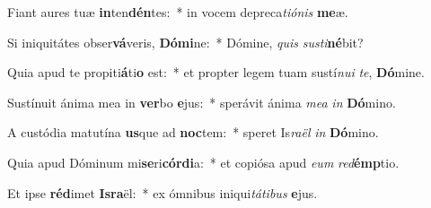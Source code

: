 \item Fiant aures tuæ \textbf{in}ten\textbf{dén}tes:~* in vocem depreca\textit{ti}\textit{ó}\textit{nis} \textbf{me}æ.
\item Si iniquitátes obser\textbf{vá}veris, \textbf{Dó}\textbf{mi}ne:~* Dómine, \textit{quis} \textit{sus}\textit{ti}\textbf{né}bit?
\item Quia apud te propiti\textbf{á}ti\textbf{o} est:~* et propter legem tuam sustí\textit{nu}\textit{i} \textit{te}, \textbf{Dó}mine.
\item Sustínuit ánima mea in \textbf{ver}bo \textbf{e}jus:~* sperávit ánima \textit{me}\textit{a} \textit{in} \textbf{Dó}mino.
\item A custódia matutína \textbf{us}que ad \textbf{noc}tem:~* speret Is\textit{ra}\textit{ël} \textit{in} \textbf{Dó}mino.
\item Quia apud Dóminum mi\textbf{se}ri\textbf{cór}\textbf{di}a:~* et copiósa apud \textit{e}\textit{um} \textit{red}\textbf{émp}tio.
\item Et ipse \textbf{réd}imet \textbf{Is}\textbf{ra}ël:~* ex ómnibus iniqui\textit{tá}\textit{ti}\textit{bus} \textbf{e}jus.
